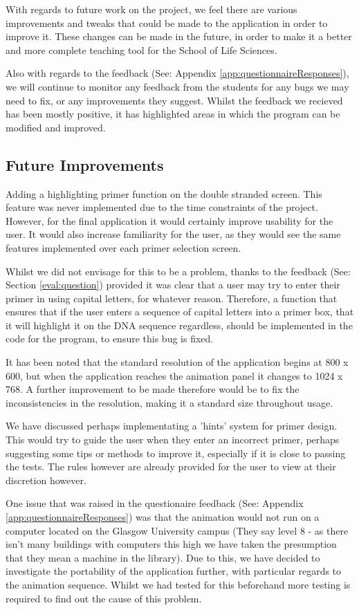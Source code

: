 With regards to future work on the project, we feel there are various improvements and tweaks that could be made to the application in order to improve it. These changes can be made in the future, in order to make it a better and more complete teaching tool for the School of Life Sciences.

Also with regards to the feedback (See: Appendix \ref{app:questionnaireResponses}), we will continue to monitor any feedback from the students for any bugs we may need to fix, or any improvements they suggest. Whilst the feedback we recieved has been mostly positive, it has highlighted areas in which the program can be modified and improved.

\subsection{Future Improvements}

Adding a highlighting primer function on the double stranded screen. This feature was never implemented due to the time constraints of the project. However, for the final application it would certainly improve usability for the user. It would also increase familiarity for the user, as they would see the same features implemented over each primer selection screen.

Whilst we did not envisage for this to be a problem, thanks to the feedback (See: Section \ref{eval:question}) provided it was clear that a user may try to enter their primer in using capital letters, for whatever reason. Therefore, a function that ensures that if the user enters a sequence of capital letters into a primer box, that it will highlight it on the DNA sequence regardless, should be implemented in the code for the program, to ensure this bug is fixed.

It has been noted that the standard resolution of the application begins at 800 x 600, but when the application reaches the animation panel it changes to 1024 x 768. A further improvement to be made therefore would be to fix the inconsistencies in the resolution, making it a standard size throughout usage.

We have discussed perhaps implementating a 'hints' system for primer design. This would try to guide the user when they enter an incorrect primer, perhaps suggesting some tips or methods to improve it, especially if it is close to passing the tests. The rules however are already provided for the user to view at their discretion however.

One issue that was raised in the questionaire feedback (See: Appendix \ref{app:questionnaireResponses}) was that the animation would not run on a computer located on the Glasgow University campus (They say level 8 - as there isn't many buildings with computers this high we have taken the presumption that they mean a machine in the library). Due to this, we have decided to investigate the portability of the application further, with particular regards to the animation sequence. Whilst we had tested for this beforehand more testing is required to find out the cause of this problem.

